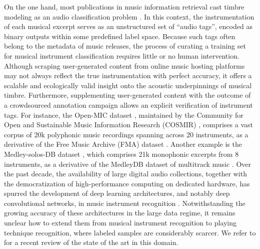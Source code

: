 \documentclass{bmcart}
\begin{document}
On the one hand, most publications in music information retrieval cast timbre modeling as an audio classification problem  \cite{martin1998asa,brown1999jasa,eronen2000icassp,herrera2003jnmr,wieczorkowska2003jiis,livshin2004dafx,krishna2004icassp,kaminskyj2005jiis,benetos2006icassp,bhalke2016jiis}.
In this context, the instrumentation of each musical excerpt serves as an unstructured set of ``audio tags'', encoded as binary outputs within some predefined label space.
Because such tags often belong to the metadata of music releases, the process of curating a training set for musical instrument classification requires little or no human intervention.
Although scraping user-generated content from online music hosting platforms may not always reflect the true instrumentation with perfect accuracy, it offers a scalable and ecologically valid insight onto the acoustic underpinnings of musical timbre.
Furthermore, supplementing user-generated content with the outcome of a crowdsourced annotation campaign allows an explicit verification of instrument tags.
For instance, the Open-MIC dataset \cite{humphrey2018ismir}, maintained by the Community for Open and Sustainable Music Information Research (COSMIR) \cite{mcfee2016ismir}, comprises a vast corpus of 20k polyphonic music recordings spanning across 20 instruments, as a derivative of the Free Music Archive (FMA) dataset \cite{defferrard2017ismir}.
Another example is the Medley-solos-DB dataset \cite{lostanlen2016ismir}, which comprises 21k monophonic excerpts from 8 instruments, as a derivative of the MedleyDB dataset of multitrack music \cite{bittner2014ismir}.
Over the past decade, the availability of large digital audio collections, together with the democratization of high-performance computing on dedicated hardware, has spurred the development of deep learning architectures, and notably deep convolutional networks, in music instrument recognition \cite{mcfee2015ismir,pons2017eusipco,gururani2018ismir}.
Notwithstanding the growing accuracy of these architectures in the large data regime, it remains unclear how to extend them from musical instrument recognition to playing technique recognition, where labeled samples are considerably scarcer.
We refer to \cite{han2017taslp} for a recent review of the state of the art in this domain.
\end{document}
